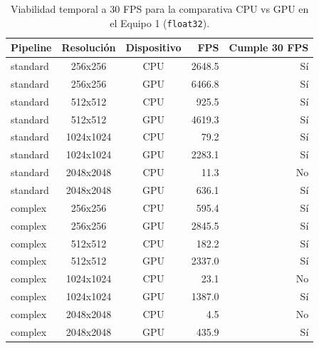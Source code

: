 \begin{table}[htbp]
\centering
\renewcommand{\arraystretch}{1.2}
\setlength{\tabcolsep}{8pt}
\begin{tabular}{|l|c|c|r|r|}
\hline
\rowcolor[gray]{0.90}
\textbf{Pipeline} & \textbf{Resolución} & \textbf{Dispositivo} & \textbf{FPS} & \textbf{Cumple 30 FPS} \\
\hline
standard & 256x256 & CPU & 2648.5 & Sí \\
\hline
standard & 256x256 & GPU & 6466.8 & Sí \\
\hline
standard & 512x512 & CPU & 925.5 & Sí \\
\hline
standard & 512x512 & GPU & 4619.3 & Sí \\
\hline
standard & 1024x1024 & CPU & 79.2 & Sí \\
\hline
standard & 1024x1024 & GPU & 2283.1 & Sí \\
\hline
standard & 2048x2048 & CPU & 11.3 & No \\
\hline
standard & 2048x2048 & GPU & 636.1 & Sí \\
\hline
complex & 256x256 & CPU & 595.4 & Sí \\
\hline
complex & 256x256 & GPU & 2845.5 & Sí \\
\hline
complex & 512x512 & CPU & 182.2 & Sí \\
\hline
complex & 512x512 & GPU & 2337.0 & Sí \\
\hline
complex & 1024x1024 & CPU & 23.1 & No \\
\hline
complex & 1024x1024 & GPU & 1387.0 & Sí \\
\hline
complex & 2048x2048 & CPU & 4.5 & No \\
\hline
complex & 2048x2048 & GPU & 435.9 & Sí \\
\hline
\end{tabular}
\caption{Viabilidad temporal a 30 FPS para la comparativa CPU vs GPU en el Equipo 1 (\texttt{float32}).}
\label{tab:cpu_gpu_equipo1_realtime_30fps}
\end{table}
